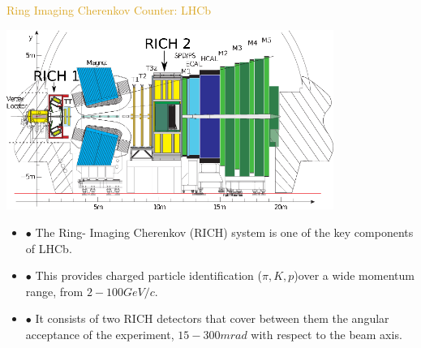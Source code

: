 \documentclass[11pt]{beamer} %
\renewcommand{\(}{\begin{columns}}
\renewcommand{\)}{\end{columns}}
\newcommand{\<}[1]{\begin{column}{#1}}
\renewcommand{\>}{\end{column}}
\newcommand{\itt}{\begin{itemize}}
\newcommand{\tti}{\end{itemize}}
\begin{document}
\begin{frame}{\textcolor{Goldenrod}{Ring Imaging Cherenkov Counter: LHCb}}
  \begin{center}
    \includegraphics[width=0.8\textwidth, height=0.4\textheight]{./Images/RICH_counters_04}\\
  \end{center}
\small
  \itt
\item[$\bullet$] The Ring-
  Imaging Cherenkov (RICH) system is one of the key components of LHCb.
\item[$\bullet$] This provides charged particle identification ($\pi
  , K , p$)over
  a wide momentum range, from $2-100 GeV/c$.
\item[$\bullet$] It consists of two RICH detectors that cover between them the
  angular acceptance of the experiment, $15 - 300 mrad$ with respect to
  the beam axis.
  \tti
\end{frame}  
\end{document}
